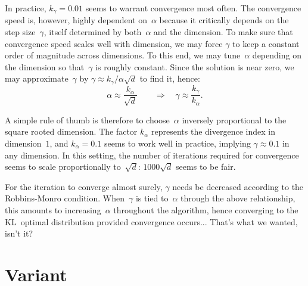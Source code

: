 \documentclass{article}
\begin{document}
In practice, $k_\gamma=0.01$ seems to warrant convergence most often. The convergence speed is, however, highly dependent on~$\alpha$ because it critically depends on the step size~$\gamma$, itself determined by both~$\alpha$ and the dimension. To make sure that convergence speed scales well with dimension, we may force  $\gamma$ to keep a constant order of magnitude across dimensions. To this end, we may tune~$\alpha$ depending on the dimension so that~$\gamma$ is roughly constant. Since the solution is near zero, we may approximate~$\gamma$ by $\gamma\approx k_\gamma/\alpha\sqrt{d}$ to find it, hence:
$$
\alpha \approx \frac{k_\alpha}{\sqrt{d}}
\qquad \Rightarrow \quad
\gamma \approx \frac{k_\gamma}{k_\alpha}.
$$

A simple rule of thumb is therefore to choose~$\alpha$ inversely proportional to the square rooted dimension. The factor $k_\alpha$ represents the divergence index in dimension~$1$, and $k_\alpha=0.1$ seems to work well in practice, implying $\gamma\approx 0.1$ in any dimension. In this setting, the number of iterations required for convergence seems to scale proportionally to~$\sqrt{d}$: $1000\sqrt{d}$ seems to be fair. 


For the iteration to converge almost surely, $\gamma$ needs be decreased according to the Robbins-Monro condition. When~$\gamma$ is tied to~$\alpha$ through the above relationship, this amounts to increasing~$\alpha$ throughout the algorithm, hence converging to the KL~optimal distribution provided convergence occurs... That's what we wanted, isn't it?





\section{Variant}
\end{document}
